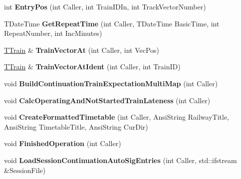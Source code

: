 \begin{DoxyCompactItemize}
\mbox{\label{class_t_train_controller_aa60ab73bef848c5458cdf0217092aef8}} 
int {\bfseries Entry\+Pos} (int Caller, int Train\+I\+D\+In, int Track\+Vector\+Number)
\item 
\mbox{\label{class_t_train_controller_a435ef46f062904e85ae9792faaecdcf7}} 
T\+Date\+Time {\bfseries Get\+Repeat\+Time} (int Caller, T\+Date\+Time Basic\+Time, int Repeat\+Number, int Inc\+Minutes)
\item 
\mbox{\label{class_t_train_controller_aa09adf9c442406cccc270d6703867a1d}} 
\mbox{\hyperlink{class_t_train}{T\+Train}} \& {\bfseries Train\+Vector\+At} (int Caller, int Vec\+Pos)
\item 
\mbox{\label{class_t_train_controller_a4d5de42d6e9e92191241963599581210}} 
\mbox{\hyperlink{class_t_train}{T\+Train}} \& {\bfseries Train\+Vector\+At\+Ident} (int Caller, int Train\+ID)
\item 
\mbox{\label{class_t_train_controller_a0445987b1a355de3aef2c21b66d1ed8b}} 
void {\bfseries Build\+Continuation\+Train\+Expectation\+Multi\+Map} (int Caller)
\item 
\mbox{\label{class_t_train_controller_aadffada34a23350d7773bc7735e423a1}} 
void {\bfseries Calc\+Operating\+And\+Not\+Started\+Train\+Lateness} (int Caller)
\item 
\mbox{\label{class_t_train_controller_a4ab4b6a568064d27c65f0770e5a5ccd0}} 
void {\bfseries Create\+Formatted\+Timetable} (int Caller, Ansi\+String Railway\+Title, Ansi\+String Timetable\+Title, Ansi\+String Cur\+Dir)
\item 
\mbox{\label{class_t_train_controller_a07d3d10bf08d4e916b652d676c917335}} 
void {\bfseries Finished\+Operation} (int Caller)
\item 
\mbox{\label{class_t_train_controller_ae30ca688c6c3672e98692a13f29b7a4b}} 
void {\bfseries Load\+Session\+Continuation\+Auto\+Sig\+Entries} (int Caller, std\+::ifstream \&Session\+File)
\item 

\end{DoxyCompactItemize}
